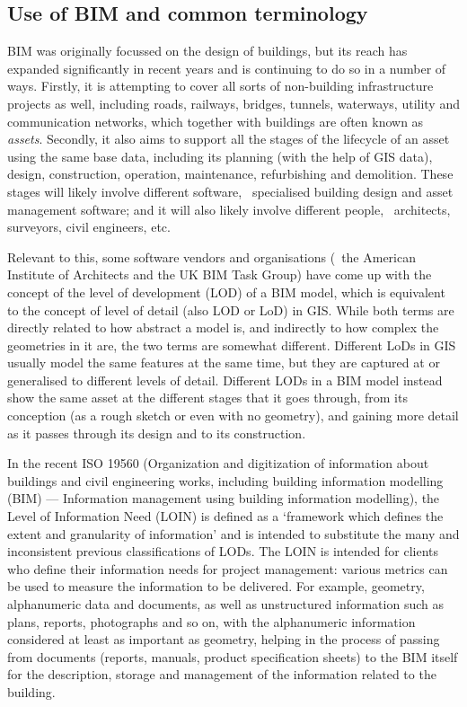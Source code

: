 \subsection{Use of BIM and common terminology}

BIM was originally focussed on the design of buildings, but its reach has expanded significantly in recent years and is continuing to do so in a number of ways.
Firstly, it is attempting to cover all sorts of non-building infrastructure projects as well, including roads, railways, bridges, tunnels, waterways, utility and communication networks, which together with buildings are often known as \emph{assets}.
Secondly, it also aims to support all the stages of the lifecycle of an asset using the same base data, including its planning (with the help of GIS data), design, construction, operation, maintenance, refurbishing and demolition.
These stages will likely involve different software, \eg\ specialised building design and asset management software; and it will also likely involve different people, \eg\ architects, surveyors, civil engineers, etc.





Relevant to this, some software vendors and organisations (\eg\ the American Institute of Architects and the UK BIM Task Group) have come up with the concept of the level of development (LOD) of a BIM model, which is equivalent to the concept of level of detail (also LOD or LoD) in GIS\@.
While both terms are directly related to how abstract a model is, and indirectly to how complex the geometries in it are, the two terms are somewhat different.
Different LoDs in GIS usually model the same features at the same time, but they are captured at or generalised to different levels of detail.
Different LODs in a BIM model instead show the same asset at the different stages that it goes through, from its conception (as a rough sketch or even with no geometry), and gaining more detail as it passes through its design and to its construction.

In the recent ISO 19560 (Organization and digitization of information about buildings and civil engineering works, including building information modelling (BIM) — Information management using building information modelling), the Level of Information Need (LOIN) is defined as a `framework which defines the extent and granularity of information' and is intended to substitute the many and inconsistent previous classifications of LODs.
The LOIN is intended for clients who define their information needs for project management: various metrics can be used to measure the information to be delivered.
For example, geometry, alphanumeric data and documents, as well as unstructured information such as plans, reports, photographs and so on, with the alphanumeric information considered at least as important as geometry, helping in the process of passing from documents (reports, manuals, product specification sheets) to the BIM itself for the description, storage and management of the information related to the building.

